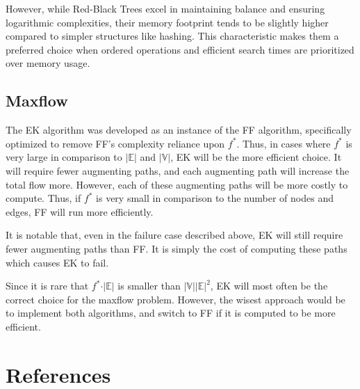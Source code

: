 \documentclass[12pt]{amsart}
\begin{document}
    However, while Red-Black Trees excel in maintaining balance and ensuring 
    logarithmic complexities, their memory footprint tends to be slightly higher 
    compared to simpler structures like hashing. This characteristic makes them a 
    preferred choice when ordered operations and efficient search times are 
    prioritized over memory usage.

\subsection{Maxflow}

    The EK algorithm was developed as an instance of the FF
    algorithm, specifically optimized to remove FF's complexity
    reliance upon $f^*$. Thus, in cases where $f^*$ is very
    large in comparison to $\vert \mathbb{E} \vert$ and
    $\vert \mathbb{V} \vert$, EK will be the more efficient
    choice. It will require fewer augmenting paths, and each
    augmenting path will increase the total flow more. However,
    each of these augmenting paths will be more costly to
    compute. Thus, if $f^*$ is very small in comparison to the
    number of nodes and edges, FF will run more efficiently.

    It is notable that, even in the failure case described
    above, EK will still require fewer augmenting paths than FF.
    It is simply the cost of computing these paths which causes
    EK to fail.

    Since it is rare that $f^* \cdot \vert \mathbb{E} \vert$ is
    smaller than
    $\vert \mathbb{V} \vert \vert \mathbb{E} \vert ^2$, EK will
    most often be the correct choice for the maxflow problem.
    However, the wisest approach would be to implement both
    algorithms, and switch to FF if it is computed to be more
    efficient.

\newpage
\section{References}
\end{document}
